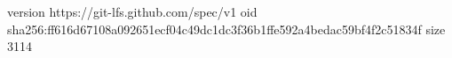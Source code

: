 version https://git-lfs.github.com/spec/v1
oid sha256:ff616d67108a092651ecf04c49dc1dc3f36b1ffe592a4bedac59bf4f2c51834f
size 3114
